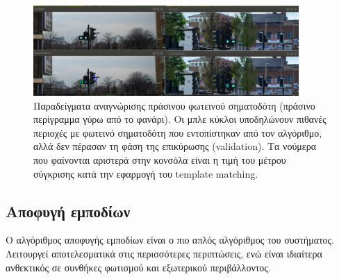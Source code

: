 \begin{figure}[H]
    \centering
    \includegraphics[width=0.9\textwidth]{images/test_light4.png}
    \caption{Παραδείγματα αναγνώρισης πράσινου φωτεινού σηματοδότη (πράσινο περίγραμμα γύρω από το φανάρι). Οι μπλε κύκλοι υποδηλώνουν πιθανές περιοχές με φωτεινό σηματοδότη που εντοπίστηκαν από τον αλγόριθμο, αλλά δεν πέρασαν τη φάση της επικύρωσης (validation). Τα νούμερα που φαίνονται αριστερά στην κονσόλα είναι η τιμή του μέτρου σύγκρισης κατά την εφαρμογή του template matching.}
    \label{fig:test-light4}
\end{figure}

\subsection{Αποφυγή εμποδίων}
Ο αλγόριθμος αποφυγής εμποδίων είναι ο πιο απλός αλγόριθμος του συστήματος. Λειτουργεί αποτελεσματικά στις περισσότερες περιπτώσεις, ενώ είναι ιδιαίτερα ανθεκτικός σε συνθήκες φωτισμού και εξωτερικού περιβάλλοντος.

